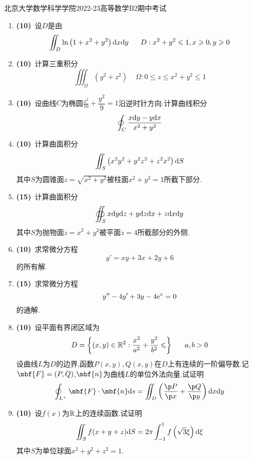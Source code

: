 \documentclass{ctexart}
\begin{document}
\pagestyle{empty}
\begin{center}\Large
    北京大学数学科学学院2022-23高等数学B2期中考试
\end{center}
\begin{enumerate}[leftmargin=*,label=\textbf{\arabic*.}]
    \item \textbf{(10)}\ 设$D$是由
        \[\iint_{D}\ln\left(1+x^2+y^2\right)\dx\di y\ \ \ \ \ D:x^2+y^2\leqslant1,x\geqslant0,y\geqslant0\]
    \item \textbf{(10)}\ 计算三重积分
        \[\iiint_{\Omega}\left(y^2+z^2\right)\ \ \ \ \ \Omega:0\leqslant z\leqslant x^2+y^2\leqslant1\]
    \item \textbf{(10)}\ 设曲线$C$为椭圆$\frac{x^2}{16}+\dfrac{y^2}{9}=1$沿逆时针方向.计算曲线积分
        \[\oint_{C}\dfrac{x\mathrm{d} y-y\mathrm{d} x}{x^2+y^2}\]
    \item \textbf{(10)}\ 计算曲面积分
        \[\iint_{S}\left(x^2y^2+y^2z^2+z^2x^2\right)\mathrm{d} S\]
        其中$S$为圆锥面$z=\sqrt{x^2+y^2}$被柱面$x^2+y^2=1$所截下部分.
    \item \textbf{(15)}\ 计算曲面积分
        \[\oiint_Sx\mathrm{d} y\mathrm{d} z+y\mathrm{d} z\mathrm{d} x+z\mathrm{d} x\mathrm{d} y\]
        其中$S$为抛物面$z=x^2+y^2$被平面$z=4$所截部分的外侧.
    \item \textbf{(10)}\ 求常微分方程
        \[y'=xy+3x+2y+6\]
        的所有解.
    \item \textbf{(15)}\ 求常微分方程
        \[y''-4y'+3y-4\mathrm{e}^x=0\]
        的通解.
    \item \textbf{(10)}\ 设平面有界闭区域为
        \[D=\left\{(x,y)\in\R^2:\dfrac{x^2}{a^2}+\dfrac{y^2}{b^2}\leqslant\right\}\ \ \ \ \ a,b>0\]
        设曲线$L$为$D$的边界,函数$P(x,y),Q(x,y)$在$D$上有连续的一阶偏导数.记$\mbf{F}=(P,Q)$,$\mbf{n}$为曲线$L$的单位外法向量.试证明
        \[\oint_{L^+}\mbf{F}\cdot\mbf{n}\di s=\iint_{D}\left(\dfrac{\p P}{\p x}+\dfrac{\p Q}{\p y}\right)\di x\di y\]
    \item \textbf{(10)}\ 设$f(x)$为$\mathbb{R}$上的连续函数.试证明
        \[\iint_{S}f(x+y+z)\mathrm{d} S=2\pi\int_{-1}^{1}f\left(\sqrt{3}\xi\right)\mathrm{d}\xi\]
        其中$S$为单位球面$x^2+y^2+z^2=1$.
\end{enumerate}
\end{document}
